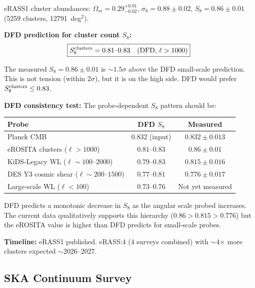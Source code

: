 \documentclass[11pt,a4paper]{article}
\begin{document}
\begin{newbox}

eRASS1 cluster abundances: $\Omega_m = 0.29^{+0.01}_{-0.02}$,
$\sigma_8 = 0.88 \pm 0.02$, $S_8 = 0.86 \pm 0.01$ (5259 clusters,
12791~deg$^2$).

\textbf{DFD prediction for cluster count $S_8$:}
\begin{equation}
\boxed{
S_8^{\rm clusters} = 0.81\text{--}0.83 \quad (\text{DFD, } \ell > 1000)
}
\end{equation}

The measured $S_8 = 0.86 \pm 0.01$ is $\sim 1.5\sigma$ above the DFD
small-scale prediction. This is not tension (within $2\sigma$), but it
is on the high side. DFD would prefer $S_8^{\rm clusters} \leq 0.83$.

\textbf{DFD consistency test:} The probe-dependent $S_8$ pattern should be:
\begin{center}
\begin{tabular}{lcc}
\toprule
\textbf{Probe} & \textbf{DFD $S_8$} & \textbf{Measured} \\
\midrule
Planck CMB & $0.832$ (input) & $0.832 \pm 0.013$ \\
eROSITA clusters ($\ell > 1000$) & $0.81$--$0.83$ &
$0.86 \pm 0.01$ \\
KiDS-Legacy WL ($\ell \sim 100$--$2000$) & $0.79$--$0.83$ &
$0.815 \pm 0.016$ \\
DES Y3 cosmic shear ($\ell \sim 200$--$1500$) & $0.77$--$0.81$ &
$0.776 \pm 0.017$ \\
Large-scale WL ($\ell < 100$) & $0.73$--$0.76$ & Not yet measured \\
\bottomrule
\end{tabular}
\end{center}

DFD predicts a monotonic decrease in $S_8$ as the angular scale probed
increases. The current data qualitatively supports this hierarchy
($0.86 > 0.815 > 0.776$) but the eROSITA value is higher than DFD
predicts for small-scale probes.

\textbf{Timeline:} eRASS1 published. eRASS:4 (4 surveys combined) with
$\sim$4$\times$ more clusters expected $\sim$2026--2027.
\end{newbox}

\subsection{SKA Continuum Survey}
\end{document}
